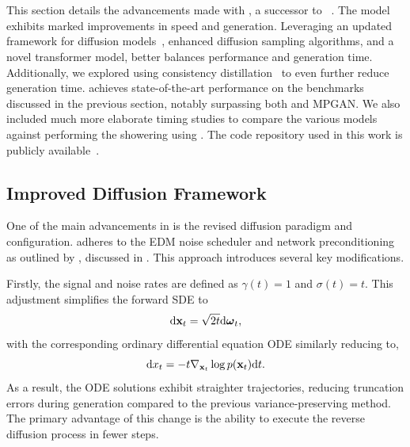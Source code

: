 \FloatBarrier

\section{\pcdroid}

This section details the advancements made with \pcdroid, a successor to \pcjedi~\cite{PCDroid}.
The \pcdroid model exhibits marked improvements in speed and generation.
Leveraging an updated framework for diffusion models~\cite{ElucidatingDesignSpace}, enhanced diffusion sampling algorithms, and a novel transformer model, \pcdroid better balances performance and generation time.
Additionally, we explored using consistency distillation~\cite{ConsistencyModels} to even further reduce generation time.
\pcdroid achieves state-of-the-art performance on the benchmarks discussed in the previous section, notably surpassing both \pcjedi and MPGAN.
We also included much more elaborate timing studies to compare the various models against performing the showering using \pythia.
The code repository used in this work is publicly available~\cite{PCDroidCode}.

\subsection{Improved Diffusion Framework}

One of the main advancements in \pcdroid is the revised diffusion paradigm and configuration.
\pcdroid adheres to the EDM noise scheduler and network preconditioning as outlined by \textcite{ElucidatingDesignSpace}, discussed in .
This approach introduces several key modifications.

Firstly, the signal and noise rates are defined as $\gamma(t)=1$ and $\sigma(t)=t$.
This adjustment simplifies the forward SDE to
\begin{equation}
    \mathrm{d} \mathbf{x}_t = \sqrt{2t} \mathrm{d} \boldsymbol{\omega}_t,
\end{equation}
with the corresponding ordinary differential equation ODE similarly reducing to,
\begin{equation}
    \mathrm{d} x_t = - t \nabla_{\mathbf{x}_t} \log p(\mathbf{x}_t) \mathrm{d} t.
\end{equation}
As a result, the ODE solutions exhibit straighter trajectories, reducing truncation errors during generation compared to the previous variance-preserving method.
The primary advantage of this change is the ability to execute the reverse diffusion process in fewer steps.

